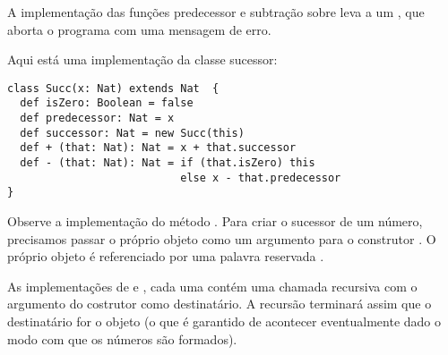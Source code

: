 A implementa\c{c}\~{a}o das fun\c{c}\~{o}es  predecessor e subtra\c{c}\~{a}o sobre  leva a 
um , que aborta o programa com uma mensagem de erro.

Aqui est\'{a} uma implementa\c{c}\~{a}o da classe sucessor: 

\begin{lstlisting}
class Succ(x: Nat) extends Nat  {
  def isZero: Boolean = false
  def predecessor: Nat = x
  def successor: Nat = new Succ(this)
  def + (that: Nat): Nat = x + that.successor
  def - (that: Nat): Nat = if (that.isZero) this 
                           else x - that.predecessor
}
\end{lstlisting}

Observe a implementa\c{c}\~{a}o do m\'{e}todo . Para criar o 
sucessor de um n\'{u}mero, precisamos passar o pr\'{o}prio objeto como um 
argumento para o construtor . O pr\'{o}prio objeto \'{e} referenciado
por uma palavra reservada .   

As implementa\c{c}\~{o}es de \code{+} e \code{-}, cada uma cont\'{e}m uma chamada 
recursiva com o argumento do costrutor como destinat\'{a}rio. A recurs\~{a}o 
terminar\'{a} assim que o destinat\'{a}rio for o objeto  (o que \'{e} 
garantido de acontecer eventualmente dado o modo com que os n\'{u}meros s\~{a}o formados).

